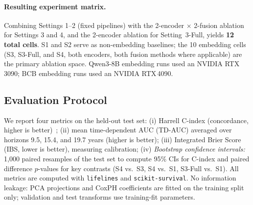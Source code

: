 \paragraph{Resulting experiment matrix.}
Combining Settings 1--2 (fixed pipelines) with the 2-encoder $\times$
2-fusion ablation for Settings 3 and 4, and the 2-encoder ablation for
Setting~3-Full, yields \textbf{12 total cells}.
S1 and S2 serve as non-embedding baselines; the 10 embedding cells
(S3, S3-Full, and S4, both encoders, both fusion methods where applicable)
are the primary ablation space.
Qwen3-8B embedding runs used an NVIDIA RTX\,3090; BCB embedding runs used
an NVIDIA RTX\,4090.

\subsection{Evaluation Protocol}
We report four metrics on the held-out test set:
(i) Harrell C-index (concordance, higher is better)~\cite{harrellcindex};
(ii) mean time-dependent AUC (TD-AUC) averaged over horizons
    9.5, 15.4, and 19.7 years (higher is better);
(iii) Integrated Brier Score (IBS, lower is better), measuring calibration;
(iv) \emph{Bootstrap confidence intervals:} 1{,}000 paired resamples of the test set to compute 95\% CIs for C-index and paired difference $p$-values for key contrasts (S4 vs.\ S3, S4 vs.\ S1, S3-Full vs.\ S1).
All metrics are computed with \texttt{lifelines} and \texttt{scikit-survival}.
No information leakage: PCA projections and CoxPH coefficients are fitted
on the training split only; validation and test transforms use
training-fit parameters.

